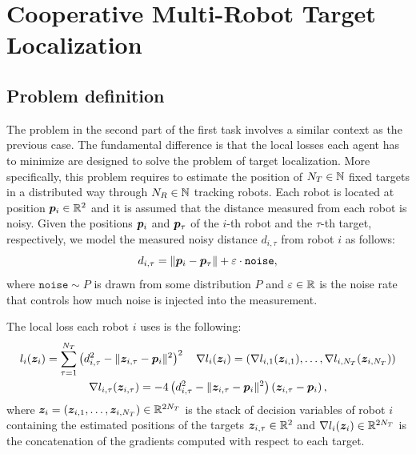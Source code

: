 \documentclass[a4paper,11pt,oneside]{book}
\begin{document}
\chapter{Cooperative Multi-Robot Target Localization} \label{ch:localization}


\section{Problem definition}

The problem in the second part of the first task involves a similar context as the previous case. The fundamental difference is that the local losses each agent has to minimize are designed to solve the problem of target localization. More specifically, this problem requires to estimate the position of $N_T \in {\mathbb{N}}$ fixed targets in a distributed way through $N_R \in {\mathbb{N}}$ tracking robots. Each robot is located at position ${\bm{p}}_i \in {\mathbb{R}}^2$ and it is assumed that the distance measured from each robot is noisy. Given the positions ${\bm{p}}_i$ and ${\bm{p}}_\tau$ of the $i$-th robot and the $\tau$-th target, respectively, we model the measured noisy distance $d_{i,\tau}$ from robot $i$ as follows:
\[
      d_{i,\tau} = \Vert {\bm{p}}_i - {\bm{p}}_\tau \Vert + \varepsilon \cdot \texttt{noise},
\]
where $\texttt{noise} \sim P$ is drawn from some distribution $P$ and $\varepsilon \in {\mathbb{R}}$ is the noise rate that controls how much noise is injected into the measurement.

The local loss each robot $i$ uses is the following:
\[
      \begin{gathered}
            l_i({\bm{z}}_i) = \sum_{\tau=1}^{N_T} \left( d_{i,\tau}^2 - \Vert {\bm{z}}_{i,\tau} - {\bm{p}}_i \Vert^2 \right)^2
            \quad
            \nabla l_{i}({\bm{z}}_i) = (\nabla l_{i,1}({\bm{z}}_{i,1}), \dots, \nabla l_{i,N_T}({\bm{z}}_{i,N_T}))
            \\
            \nabla l_{i,\tau}({\bm{z}}_{i,\tau}) = -4 \left( d_{i,\tau}^2 - \Vert {\bm{z}}_{i,\tau} - {\bm{p}}_i \Vert^2 \right) \left( {\bm{z}}_{i,\tau} - {\bm{p}}_i \right),
      \end{gathered}
\]
where ${\bm{z}}_i = ({\bm{z}}_{i,1}, \dots, {\bm{z}}_{i,N_T}) \in {\mathbb{R}}^{2N_T}$ is the stack of decision variables of robot $i$ containing the estimated positions of the targets ${\bm{z}}_{i,\tau} \in {\mathbb{R}}^2$ and $\nabla l_i({\bm{z}}_i) \in {\mathbb{R}}^{2N_T}$ is the concatenation of the gradients computed with respect to each target.
\end{document}
